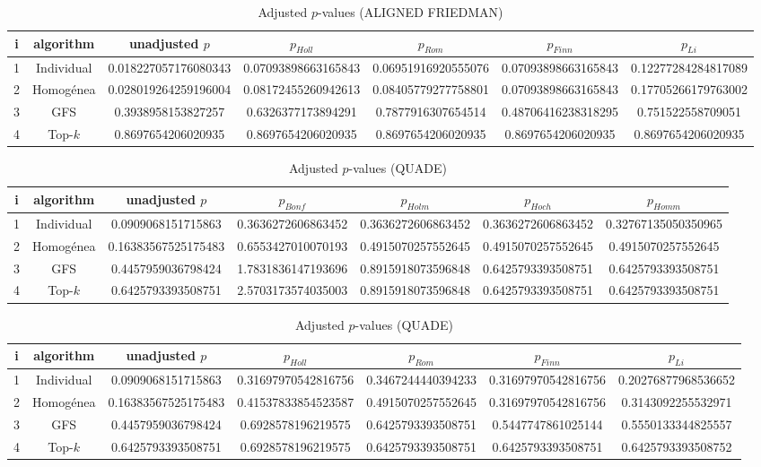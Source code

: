 \documentclass[a4paper,10pt]{article}
\begin{document}
\begin{landscape}
\begin{table}[!htp]
\centering\scriptsize
\caption{Adjusted $p$-values (ALIGNED FRIEDMAN)}
\begin{tabular}{ccccccc}
i&algorithm&unadjusted $p$&$p_{Holl}$&$p_{Rom}$&$p_{Finn}$&$p_{Li}$\\
\hline
1&Individual&0.018227057176080343&0.07093898663165843&0.06951916920555076&0.07093898663165843&0.12277284284817089\\
2&Homogénea&0.028019264259196004&0.08172455260942613&0.08405779277758801&0.07093898663165843&0.17705266179763002\\
3&GFS&0.3938958153827257&0.6326377173894291&0.7877916307654514&0.48706416238318295&0.751522558709051\\
4&Top-$k$&0.8697654206020935&0.8697654206020935&0.8697654206020935&0.8697654206020935&0.8697654206020935\\
\hline
\end{tabular}
\end{table}


\newpage

\begin{table}[!htp]
\centering\scriptsize
\caption{Adjusted $p$-values (QUADE)}
\begin{tabular}{ccccccc}
i&algorithm&unadjusted $p$&$p_{Bonf}$&$p_{Holm}$&$p_{Hoch}$&$p_{Homm}$\\
\hline
1&Individual&0.0909068151715863&0.3636272606863452&0.3636272606863452&0.3636272606863452&0.32767135050350965\\
2&Homogénea&0.16383567525175483&0.6553427010070193&0.4915070257552645&0.4915070257552645&0.4915070257552645\\
3&GFS&0.4457959036798424&1.7831836147193696&0.8915918073596848&0.6425793393508751&0.6425793393508751\\
4&Top-$k$&0.6425793393508751&2.5703173574035003&0.8915918073596848&0.6425793393508751&0.6425793393508751\\
\hline
\end{tabular}
\end{table}

\begin{table}[!htp]
\centering\scriptsize
\caption{Adjusted $p$-values (QUADE)}
\begin{tabular}{ccccccc}
i&algorithm&unadjusted $p$&$p_{Holl}$&$p_{Rom}$&$p_{Finn}$&$p_{Li}$\\
\hline
1&Individual&0.0909068151715863&0.31697970542816756&0.3467244440394233&0.31697970542816756&0.20276877968536652\\
2&Homogénea&0.16383567525175483&0.41537833854523587&0.4915070257552645&0.31697970542816756&0.3143092255532971\\
3&GFS&0.4457959036798424&0.6928578196219575&0.6425793393508751&0.5447747861025144&0.5550133344825557\\
4&Top-$k$&0.6425793393508751&0.6928578196219575&0.6425793393508751&0.6425793393508751&0.6425793393508752\\
\hline
\end{tabular}
\end{table}

\end{landscape}
\end{document}
